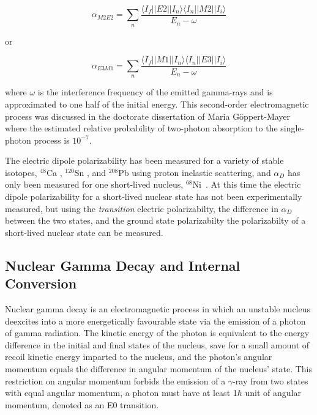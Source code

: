 \documentclass[cnatzke_thesis_proposal.tex]{subfiles}
\begin{document}
\begin{equation} \label{eqn:m2e2_dipole_polarizability}
    \alpha_{M2E2} = \sum_n \frac{\langle I_f || E2 || I_n \rangle \langle I_n || M2 || I_i \rangle}{E_n - \omega}
\end{equation}

or 

\begin{equation} \label{eqn:m2e2_dipole_polarizability}
    \alpha_{E3M1} = \sum_n \frac{\langle I_f || M1 || I_n \rangle \langle I_n || E3 || I_i \rangle}{E_n - \omega}
\end{equation}

where $\omega$ is the interference frequency of the emitted gamma-rays and is approximated to one half of the initial energy. 
This second-order electromagnetic process was discussed in the doctorate dissertation of Maria G\"oppert-Mayer~\cite{goppert-mayer_uber_1931} where the estimated relative probability of two-photon absorption to the single-photon process is $10^{-7}$. 

The electric dipole polarizability has been measured for a variety of stable isotopes, $^{48}$Ca \cite{birkhan_electric_2017}, $^{120}$Sn \cite{hashimoto_dipole_2015}, and $^{208}$Pb \cite{tamii_complete_2011} using proton inelastic scattering, and $\alpha_D$ has only been measured for one short-lived nucleus, $^{68}$Ni~\cite{rossi_measurement_2013}.
At this time the electric dipole polarizability for a short-lived nuclear state has not been experimentally measured, but using the \textit{transition} electric polarizabilty, the difference in $\alpha_D$ between the two states, and the ground state polarizabilty the polarizabilty of a short-lived nuclear state can be measured.

\subsection{Nuclear Gamma Decay and Internal Conversion}
Nuclear gamma decay is an electromagnetic process in which an unstable nucleus deexcites into a more energetically favourable state via the emission of a photon of gamma radiation. 
The kinetic energy of the photon is equivalent to the energy difference in the initial and final states of the nucleus, save for a small amount of recoil kinetic energy imparted to the nucleus, and the photon's angular momentum equals the difference in angular momentum of the nucleus' state. 
This restriction on angular momentum forbids the emission of a $\gamma$-ray from two states with equal angular momentum, a photon must have at least 1$\hbar$ unit of angular momentum, denoted as an E0 transition.
\end{document}
